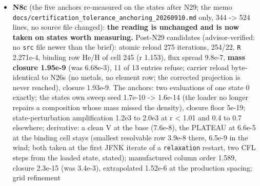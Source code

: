 \documentclass[english,a4paper]{my_memo}
\begin{document}
\begin{itemize}
  "before"; workers are to build their own controls (added to the rules
  below). \textbf{Advisor}: \texttt{steady\_species\_rows\_tests.f90} referenced
  \texttt{element\_ratio\_gate} through \texttt{element\_inventory}, which since N28 imports
  it with \texttt{use,\ only} and does not re-export it, so the suite would not
  build (N28\textquotesingle s validation did not include this suite; the advisor\textquotesingle s did not
  either): one \texttt{use\ element\_census,\ only:\ element\_ratio\_gate} line added by
  the advisor; rebuild warning-free (md5 \texttt{a9627a14}), \texttt{element\_operator}
  14/0, \texttt{certification} 42/0, \texttt{steady\_species\_rows} 189/0,
  \texttt{krylov\_and\_dogleg} 174/0; one \texttt{percent} fixed. Reported: the metal diffusion\textquotesingle s
  counter-flux is closed on hydrogen but not on momentum or internal energy
  (a trace approximation, named); \texttt{element\_census\_verify} gates the element
  ratios and only reports the mass closure (the 6.4e-3 state passed every
  gate it has): whether it should gate is a decision.
\item
  \textbf{N8c} (the five anchors re-measured on the states after N29; the memo
  \texttt{docs/certification\_tolerance\_anchoring\_20260910.md} only, 344 -\textgreater{} 524
  lines, no source file changed): \textbf{the reading is unchanged and is now
  taken on states worth measuring.} Post-N29 candidates (advisor-verified:
  no \texttt{src} file newer than the brief): atomic reload 275 iterations, 254/22,
  \texttt{\textbar{}\textbar{}R\textbar{}\textbar{}} 2.271e-4, binding row He/H of cell 245 (r 1.153), flux spread
  9.8e-7, \textbf{mass closure 1.95e-9} (was 6.68e-3), 11 of 13 entries refuse;
  carrier reload byte-identical to N26\textquotesingle s (no metals, no element row; the
  corrected projection is never reached), closure 1.93e-9. The anchors: two
  evaluations of one state 0 exactly; the state\textquotesingle s own sweep seed 1.7e-10 -\textgreater{}
  1.6e-14 (the loader no longer repairs a composition whose mass missed the
  density), closure floor 5e-19; state-perturbation amplification 1.2e3 to
  2.0e3 at r \textless{} 1.01 and 0.4 to 0.7 elsewhere; derivative: a clean V at the
  base (7.6e-8), the PLATEAU at 6.6e-5 at the binding cell stays (smallest
  resolvable row 3.9e-8 there, 6.5e-9 in the wind; both taken at the first
  JFNK iterate of a \texttt{relaxation} restart, two CFL steps from the loaded
  state, stated); manufactured column order 1.589, closure 2.3e-15 (was
  3.4e-3), extrapolated 1.52e-6 at the production spacing; grid refinement

\end{itemize}
\end{document}
